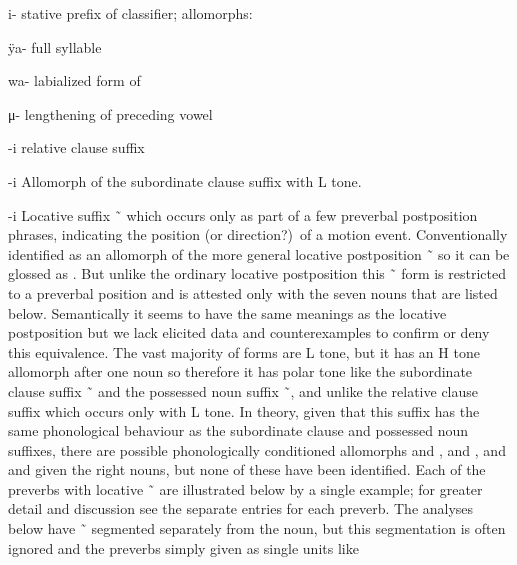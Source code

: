 \begin{morphdesc}[resume*=alphalist]
\item[i-]\label{m:i-stv}
	stative prefix of classifier;
	\newline
	allomorphs:
	\begin{allolist}
	\item[ÿa-]	full syllable
	\item[wa-]	labialized form of 
	\item[μ-]	lengthening of preceding vowel
	\end{allolist}

\item[-i]\label{m:-i-rel}
	relative clause suffix

\item[-i]\label{m:-i-sub}
	Allomorph of the subordinate clause suffix  with L tone.

\item[-i]\label{m:-i-loc}
	Locative suffix  \~\  which occurs only as part of a few preverbal postposition
		phrases, indicating the position (or direction?)\ of a motion event.
	Conventionally identified as an allomorph of the more general locative postposition
		 \~\  \parencites[33, 134, 138, 301]{leer:1991}
		so it can be glossed as .
	But unlike the ordinary locative postposition this  \~\  form is restricted to a
		preverbal position and is attested only with the seven nouns that are listed below.
	Semantically it seems to have the same meanings as the locative postposition but we lack
		elicited data and counterexamples to confirm or deny this equivalence.
	The vast majority of forms are L tone, but it has an H tone allomorph after one noun so
		therefore it has polar tone
		like the subordinate clause suffix  \~\ 
		and the possessed noun suffix  \~\ ,
		and unlike the relative clause suffix  which occurs only with L tone.
	In theory, given that this suffix has the same phonological behaviour as the subordinate clause
		and possessed noun suffixes, there are possible phonologically conditioned allomorphs
		 and ,  and , and  and 
		given the right nouns, but none of these have been identified.
	Each of the preverbs with locative  \~\  are illustrated below by a single
		example; for greater detail and discussion see the separate entries for each preverb.
	The analyses below have  \~\  segmented separately from the noun, but this
		segmentation is often ignored and the preverbs simply given as single units like

\end{morphdesc}
